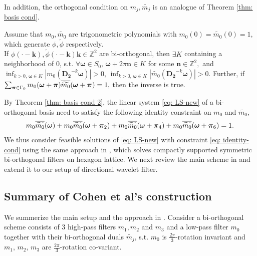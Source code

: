 In addition, the orthogonal condition on $m_j,\widetilde{m_j}$ is an analogue of Theorem \ref{thm: basis cond}.
\begin{thm}\label{thm: basis cond 2}
Assume that $m_0, \widetilde{m_0}$ are trigonometric polynomials with $m_0(0)=\widetilde{m_0}(0) = 1$, which generate $\phi,\widetilde{\phi}$ respectively.\\
If $\phi(\cdot - \boldsymbol{k}),\widetilde{\phi}(\cdot - \boldsymbol{k})\boldsymbol{k}\in\mathbb{Z}^2$ are bi-orthogonal, then $\exists K$ containing a neighborhood of 0, s.t. $\forall\boldsymbol{\omega}\in S_0,\,\boldsymbol{\omega}+2\pi\mathbf{n}\in K$ for some $\mathbf{n}\in\mathbb{Z}^2, $ and $\inf_{k>0,\,\boldsymbol{\omega}\in K}|m_0(\mathbf{D_2}^{-k}\boldsymbol{\omega})| >0$, $\inf_{k>0,\,\boldsymbol{\omega}\in K}|\widetilde{m_0}(\mathbf{D_2}^{-k}\boldsymbol{\omega})| >0$. 
 Further, if  $\sum_{\boldsymbol{\boldsymbol{\pi}}\in \Gamma_0} m_0(\boldsymbol{\omega}+\boldsymbol{\pi})\overline{\widetilde{m_{0}}}(\boldsymbol{\omega} + \boldsymbol{\pi}_{}) = 1,$ then the inverse is true.
\end{thm}
By Theorem \ref{thm: basis cond 2}, the linear system \eqref{eq: LS-new} of a bi-orthogonal basis need to satisfy the following identity constraint on $m_0$ and $\widetilde{m_0}$,
\begin{align}\label{eq: identity-cond}
m_0\overline{\widetilde{m_{0}}}(\boldsymbol{\omega}) + m_0\overline{\widetilde{m_{0}}}(\boldsymbol{\omega} + \boldsymbol{\pi}_{2}) + m_0\overline{\widetilde{m_{0}}}(\boldsymbol{\omega} + \boldsymbol{\pi}_{4}) + m_0\overline{\widetilde{m_{0}}}(\boldsymbol{\omega} + \boldsymbol{\pi}_{6}) = 1.
\end{align}
We thus consider feasible solutions of \eqref{eq: LS-new} with constraint \eqref{eq: identity-cond} using the same approach in \cite{cohen1993compactly}, which solves compactly supported symmetric bi-orthogonal filters on hexagon lattice. We next review the main scheme in \cite{cohen1993compactly} and extend it to our setup of directional wavelet filter.

\subsection{Summary of Cohen et al's construction}\label{subsec: cohen-summary}
We summerize the main setup and the approach in \cite{cohen1993compactly}. Consider a bi-orthogonal scheme consists of 3 high-pass filters $m_1,m_2$ and $m_3$ and a low-pass filter $m_0$ together with their bi-orthogonal duals $\widetilde{m_j}$, s.t.
$m_0$ is $\frac{2\pi}{3}$-rotation invariant and $m_1,\, m_2,\, m_3$ are $\frac{2\pi}{3}$-rotation co-variant.

